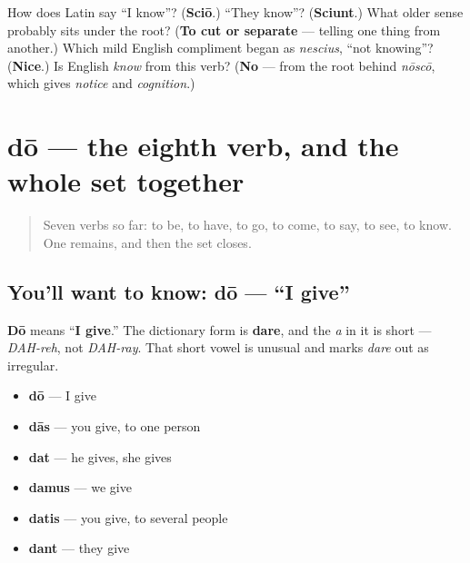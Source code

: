 \begin{tcolorbox}[breakable,colback=teal!4,colframe=teal!35!black,title={Before you move on}]
How does Latin say \textquotedblleft{}I know\textquotedblright{}? (\textbf{Sciō}.) \textquotedblleft{}They know\textquotedblright{}? (\textbf{Sciunt}.) What older sense probably sits under the root? (\textbf{To cut or separate} — telling one thing from another.) Which mild English compliment began as \emph{nescius}, \textquotedblleft{}not knowing\textquotedblright{}? (\textbf{Nice}.) Is English \emph{know} from this verb? (\textbf{No} — from the root behind \emph{nōscō}, which gives \emph{notice} and \emph{cognition}.)
\end{tcolorbox}
\section[dō, dare]{dō — the eighth verb, and the whole set together}

\label{lesson:LA-C37-do}



\begin{quote}
Seven verbs so far: to be, to have, to go, to come, to say, to see, to know. One remains, and then the set closes.
\end{quote}

\subsection*{You'll want to know: dō — \textquotedblleft{}I give\textquotedblright{}}
\textbf{Dō} means \textquotedblleft{}\textbf{I give}.\textquotedblright{} The dictionary form is \textbf{dare}, and the \emph{a} in it is short — \emph{DAH-reh}, not \emph{DAH-ray}. That short vowel is unusual and marks \emph{dare} out as irregular.

\begin{itemize}
\raggedright
  \item \textbf{dō} — I give
  \item \textbf{dās} — you give, to one person
  \item \textbf{dat} — he gives, she gives
  \item \textbf{damus} — we give
  \item \textbf{datis} — you give, to several people
  \item \textbf{dant} — they give
\end{itemize}

